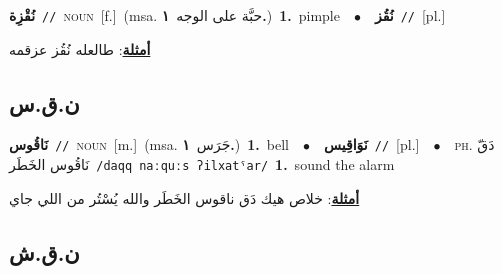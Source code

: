 \documentclass[10pt,a4paper,twoside]{article} %
\begin{document}
\begin{multicols}{2}
{\setlength\topsep{0pt}\textbf{\foreignlanguage{arabic}{نُقْزِة}}\ {\color{gray}\texttt{//}\color{black}}\ \textsc{noun}\ [f.]\ \color{gray}(msa. \foreignlanguage{arabic}{حبَّة على الوجه}~\foreignlanguage{arabic}{\textbf{١.}})\color{black}\ \textbf{1.}~pimple\ \ $\bullet$\ \ \setlength\topsep{0pt}\textbf{\foreignlanguage{arabic}{نُقُز}}\ {\color{gray}\texttt{//}\color{black}}\ [pl.]\  \begin{flushright}\color{gray}\foreignlanguage{arabic}{\textbf{\underline{\foreignlanguage{arabic}{أمثلة}}}: طالعله نُقُز عزقمه}\end{flushright}\color{black}} \vspace{2mm}

\vspace{-3mm}
\subsection*{\color{blue}\foreignlanguage{arabic}{ن.ق.س}\color{blue}{}} 

{\setlength\topsep{0pt}\textbf{\foreignlanguage{arabic}{نَاقُوس}}\ {\color{gray}\texttt{//}\color{black}}\ \textsc{noun}\ [m.]\ \color{gray}(msa. \foreignlanguage{arabic}{جَرَس}~\foreignlanguage{arabic}{\textbf{١.}})\color{black}\ \textbf{1.}~bell\ \ $\bullet$\ \ \setlength\topsep{0pt}\textbf{\foreignlanguage{arabic}{نَوَاقِيس}}\ {\color{gray}\texttt{//}\color{black}}\ [pl.]\ \ $\bullet$\ \ \textsc{ph.} \color{gray} \foreignlanguage{arabic}{دَقّ نَاقُوس الخَطَر}\color{black}\ {\color{gray}\texttt{/{\sffamily daqq naːquːs ʔilxatˤar}/}\color{black}}\ \textbf{1.}~sound the alarm\  \begin{flushright}\color{gray}\foreignlanguage{arabic}{\textbf{\underline{\foreignlanguage{arabic}{أمثلة}}}: خلاص هيك دَق ناقوس الخَطَر والله يُسْتُر من اللي جاي}\end{flushright}\color{black}} \vspace{2mm}

\vspace{-3mm}
\subsection*{\color{blue}\foreignlanguage{arabic}{ن.ق.ش}\color{blue}{}} 


\end{multicols}
\end{document}
